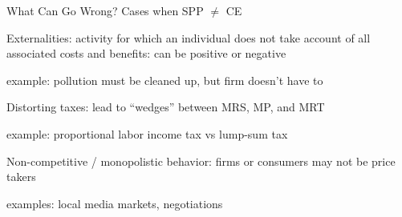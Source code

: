 \documentclass[11pt,aspectratio=169,usenames,dvipsnames]{beamer}
\let\tempone\itemize
\let\temptwo\enditemize
\renewenvironment{itemize}{\tempone\addtolength{\itemsep}{\fill}}{\temptwo}
\let\tempa\enumerate
\let\tempb\endenumerate
\renewenvironment{enumerate}{\tempa\addtolength{\itemsep}{\fill}}{\tempb}
\begin{document}
\begin{frame}{What Can Go Wrong? Cases when SPP $ \neq $ CE}
\label{slide:What_Can_Go_Wrong__Cases_when_SPP____neq___CE}
\begin{enumerate}
    \item Externalities: activity for which an individual does not take account of all associated costs and benefits: can be positive or negative
    \begin{itemize}
        \item example: pollution must be cleaned up, but firm doesn't have to
    \end{itemize}
    \item Distorting taxes: lead to ``wedges'' between MRS, MP, and MRT
    \begin{itemize}
        \item example: proportional labor income tax vs lump-sum tax
    \end{itemize}
    \item Non-competitive / monopolistic behavior: firms or consumers may not be price takers
    \begin{itemize}
        \item examples: local media markets, negotiations
    \end{itemize}
\end{enumerate}
\end{frame}
\end{document}
